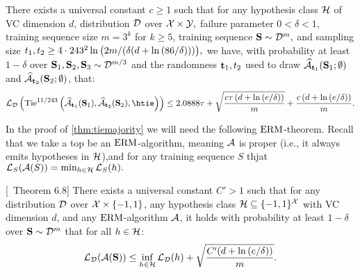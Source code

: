 \begin{theorem}\label{thm:tiemajority}
    There exists a universal constant $ c \geq1$ such that for any hypothesis class $ \mathcal{H} $ of VC dimension $ d $, distribution $ \mathcal{D} $ over $ \mathcal{X} \times \mathcal{Y},$ failure parameter $ 0<\delta<1 $, training sequence size $ m=3^{k} $ for $ k\geq 5 $, training sequence $ \mathbf{S}\sim \mathcal{D}^{m},$ and sampling size $ t_{1},t_{2}\geq 4\cdot243^{2}\ln{\big(2m/(\delta(d+\ln{\left(86/\delta \right)})) \big)},$ we have, with probability at least $ 1-\delta $ over $ \mathbf{S}_{1},\mathbf{S}_{2},\mathbf{S}_{3}\sim \mathcal{D}^{m/3} $ and the randomness $ \mathbf{t}_{1},t_{2} $ used to draw $ \widehat{\mathcal{A}}_{\mathbf{t}_{1}}(\mathbf{S}_{1};\emptyset) $ and $ \widehat{\mathcal{A}}_{\mathbf{t}_{2}}(\mathbf{S}_{2};\emptyset) $,  that:
    \begin{align*}
    \ls_{\cD}\left(\tie^{11/243}\left(\widehat{\cA}_{\rt_{1}}(\rS_{1}),\widehat{\cA}_{\rt_{2}}(\rS_{2}), \htie\right)\right)\leq  2.0888\tau+\sqrt{\frac{c\tau \left(d+\ln{(e/\delta )}\right)}{m}}+\frac{c\left(d+\ln{(e/\delta )}\right)}{m}. 
    \end{align*}
\end{theorem}

In the proof of \cref{thm:tiemajority} we will need the following $ \mathrm{ERM} $-theorem. Recall that we take a top be an $ \mathrm{ERM} $-algorithm, meaning $ \mathcal{A} $  is proper (i.e., it always emits hypotheses in $\mathcal{H}$),and for any training sequence $S$ thjat $ \operatorname{\mathcal{L}}_{S}(\mathcal{A}(S)) = \min_{h\in\mathcal{H}}\operatorname{\mathcal{L}}_{S}(h).$    

\begin{theorem}\label{thm:ermtheoremunderstanding}[\cite{Understandingmachinelearningfromtheory}~Theorem 6.8]
        There exists a universal constant $ C'>1 $ such that for any distribution $ \mathcal{D}  $ over $ \mathcal{X}\times \left\{  -1,1\right\}  $, any hypothesis class $ \mathcal{H} \subseteq \{  -1,1\}^{\mathcal{X}} $ with VC dimension $ d $, and any $ \mathrm{ERM} $-algorithm $ \mathcal{A} $,   it holds with probability at least $ 1-\delta $ over $ \mathbf{S}\sim \mathcal{D}^m$ that for all $ h\in \mathcal{H} $:  
        \begin{align*}
         \operatorname{\mathcal{L}}_{\mathcal{D}}(\mathcal{A}(\mathbf{S}))\leq \inf_{h\in \mathcal{H}}\operatorname{\mathcal{L}}_{\mathcal{D}}(h)+\sqrt{\frac{C'(d+\ln{\left(e/\delta \right)})}{m}}.
        \end{align*}    
\end{theorem}

